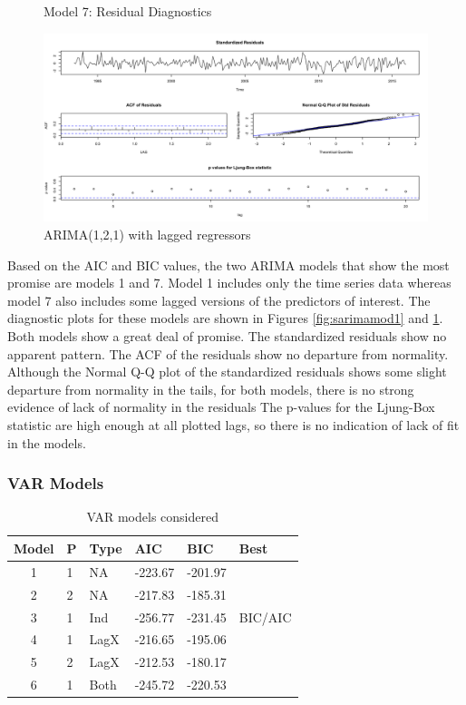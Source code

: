 \documentclass[twoside,twocolumn]{article}
\begin{document}
    \begin{figure}[htb]
    	\centering
    	\caption{Model 7: Residual Diagnostics}
     	\includegraphics[width=\linewidth]{images/sarima7}
     	\caption*{ARIMA(1,2,1) with lagged regressors}
     	\label{fig:sarimamod7}
     \end{figure}
     
     
     
		Based on the AIC and BIC values, the two ARIMA models that show the most promise are models 1 and 7.  Model 1 includes only the time series data whereas model 7 also includes some lagged versions of the predictors of interest.  The diagnostic plots for these models are shown in Figures \ref{fig:sarimamod1} and \ref{fig:sarimamod7}. Both models show a great deal of promise.  The standardized residuals show no apparent pattern. The ACF of the residuals show no departure from normality. Although the Normal Q-Q plot of the standardized residuals shows some slight departure from normality in the tails, for both models, there is no strong evidence of lack of normality in the residuals  The p-values for the  Ljung-Box statistic are high enough at all plotted lags, so there is no indication of lack of fit in the models. 

      
      \subsubsection{VAR Models}
\begin{table}[htb]
\centering
\caption{VAR models considered}
\label{tab:varchoices}
\begin{tabular}{clllll}
  \hline
 Model & P & Type &  AIC & BIC & Best \\ 
  \hline
1  & 1 & NA  &  -223.67 & -201.97 &  \\ 
  2  & 2 & NA  &   -217.83 & -185.31 &  \\ 
  3  & 1 & Ind  & -256.77 & -231.45 & BIC/AIC \\ 
  4  & 1 & LagX & -216.65 & -195.06 &  \\ 
  5  & 2 & LagX & -212.53 & -180.17 &  \\ 
  6  & 1 & Both  & -245.72 & -220.53 &  \\ 
   \hline
\end{tabular}
\end{table}
\end{document}
